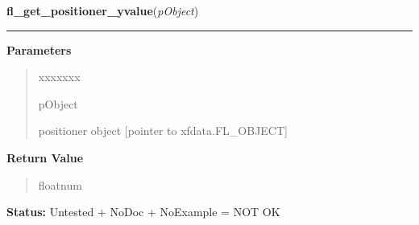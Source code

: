 \hspace{.8\funcindent}\begin{boxedminipage}{\funcwidth}

    \raggedright \textbf{fl\_get\_positioner\_yvalue}(\textit{pObject})

    \vspace{-1.5ex}

    \rule{\textwidth}{0.5\fboxrule}
\setlength{\parskip}{2ex}
\setlength{\parskip}{1ex}
      \textbf{Parameters}
      \vspace{-1ex}

      \begin{quote}
        \begin{Ventry}{xxxxxxx}

          \item[pObject]

          positioner object [pointer to xfdata.FL\_OBJECT]

        \end{Ventry}

      \end{quote}

      \textbf{Return Value}
    \vspace{-1ex}

      \begin{quote}
      floatnum

      \end{quote}

\textbf{Status:} Untested + NoDoc + NoExample = NOT OK



    \end{boxedminipage}

    \label{xformslib:library:fl_set_positioner_ybounds}

    \vspace{0.5ex}

